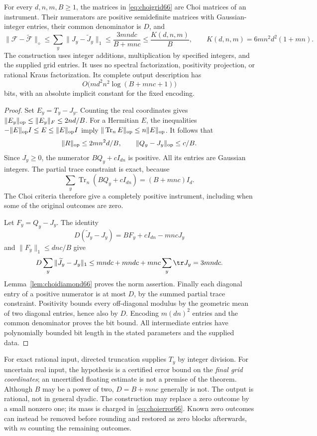 \begin{theorem}\label{thm:choiround66}
For every $d,n,m,B\ge1$, the matrices in \eqref{eq:choigrid66} are
Choi matrices of an instrument. Their numerators are positive semidefinite matrices with Gaussian-integer entries, their common denominator is $D$, and
\begin{equation}\label{eq:choierror66}
 \|\mathcal F-\widetilde{\mathcal F}\|_\diamond
 \le\sum_y\|J_y-\widetilde J_y\|_1
 \le\frac{3mndc}{B+mnc}\le\frac{K(d,n,m)}B,
 \qquad K(d,n,m)=6mn^2d^2(1+mn).
\end{equation}
The construction uses integer additions, multiplication by specified
integers, and the supplied grid entries. It uses no spectral
factorization, positivity projection, or rational Kraus
factorization. Its complete output description has
\[
 O\bigl(m d^2n^2\log(B+mnc+1)\bigr)
\]
bits, with an absolute implicit constant for the fixed encoding.
\end{theorem}
\begin{proof}
Set $E_y=T_y-J_y$. Counting the real coordinates gives
$\|E_y\|_{\rm op}\le\|E_y\|_F\le2nd/B$.
For a Hermitian $E$, the inequalities
$-\|E\|_{\rm op}I\le E\le\|E\|_{\rm op}I$ imply
$\|\operatorname{Tr}_{n}E\|_{\rm op}\le n\|E\|_{\rm op}$.
It follows that
\[
 \|R\|_{\rm op}\le2mn^2d/B,\qquad
             \|Q_y-J_y\|_{\rm op}\le c/B.
\]
Since $J_y\ge0$, the numerator $BQ_y+cI_{dn}$ is positive.
All its entries are Gaussian integers. The partial trace constraint is
exact, because
\[
 \sum_y\operatorname{Tr}_{n}(BQ_y+cI_{dn})
                       =(B+mnc)I_d.
\]
The Choi criteria therefore give a completely positive instrument,
including when some of the original outcomes are zero.

Let $F_y=Q_y-J_y$. The identity
\[
 D(\widetilde J_y-J_y)=BF_y+cI_{dn}-mncJ_y
\]
and $\|F_y\|_1\le dn c/B$ give
\[
 D\sum_y\|\widetilde J_y-J_y\|_1
 \le mndc+mndc+mnc\sum_y\tr J_y=3mndc.
\]
Lemma~\ref{lem:choidiamond66} proves the norm assertion. Finally each
diagonal entry of a positive numerator is at most $D$, by the summed
partial trace constraint. Positivity bounds every off-diagonal modulus
by the geometric mean of two diagonal entries, hence also by $D$.
Encoding $m(dn)^2$ entries and the common denominator proves the
bit bound. All intermediate entries have polynomially bounded bit
length in the stated parameters and the supplied data.
\end{proof}

For exact rational input, directed truncation supplies $T_y$ by integer
division. For uncertain real input, the hypothesis is a certified error
bound on the \emph{final grid coordinates}; an uncertified floating
estimate is not a premise of the theorem. Although $B$ may be a power
of two, $D=B+mnc$ generally is not. The output is rational, not in
general dyadic. The construction may replace a zero outcome by a
small nonzero one; its mass is charged in \eqref{eq:choierror66}.
Known zero outcomes can instead be removed before rounding and restored
as zero blocks afterwards, with $m$ counting the remaining outcomes.

